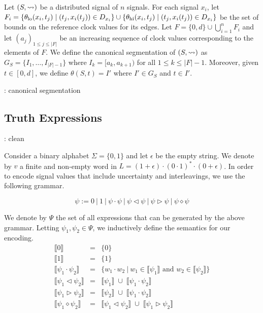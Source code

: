 Let $(S,{\rightsquigarrow})$ be a distributed signal of $n$ signals.
For each signal $x_i$, let $F_i = \{\theta_{\text{lo}}(x_i, t_j) \st (t_j, x_i(t_j)) \in D_{x_i}\} \cup \{\theta_{\text{hi}}(x_i, t_j) \st (t_j, x_i(t_j)) \in D_{x_i}\}$ be the set of bounds on the reference clock values for its edges.
Let $F = \{0, d\} \cup \bigcup_{i = 1}^{n} F_i$ and let $(a_j)_{1 \leq j \leq |F|}$ be an increasing sequence of clock values corresponding to the elements of $F$.
We define the canonical segmentation of $(S,{\rightsquigarrow})$ as $G_S = \{I_1, \ldots, I_{|F| - 1}\}$ where $I_k = [a_k, a_{k+1})$ for all $1 \leq k \leq |F| - 1$.
Moreover, given $t \in [0,d]$, we define $\theta(S,t) = I'$ where $I' \in G_S$ and $t \in I'$.

\begin{example}
	\TODO: canonical segmentation
\end{example}



\subsection{Truth Expressions}
\TODO: clean

Consider a binary alphabet $\Sigma = \{0,1\}$ and let $\epsilon$ be the empty string.
We denote by $v$ a finite and non-empty word in $L = (1 + \epsilon) \cdot (0 \cdot 1)^* \cdot (0 + \epsilon)$.
In order to encode signal values that include uncertainty and interleavings, we use the following grammar.

$$ \psi := 0 ~|~ 1 ~|~ \psi \cdot \psi ~|~ \psi \triangleleft \psi ~|~ \psi \triangleright \psi ~|~ \psi \diamond \psi $$

We denote by $\Psi$ the set of all expressions that can be generated by the above grammar.
Letting $\psi_1, \psi_2 \in \Psi$, we inductively define the semantics for our encoding.
\begin{equation}
	\begin{array}{lcl}
		\llbracket 0 \rrbracket & = & \{ 0 \} \\
		\llbracket 1 \rrbracket & = & \{ 1 \} \\
		\llbracket \psi_1 \cdot \psi_2 \rrbracket & = & \{ w_1 \cdot w_2~|~w_1 \in \llbracket \psi_1 \rrbracket \text{ and } w_2 \in \llbracket \psi_2 \rrbracket \} \\
		\llbracket \psi_1 \triangleleft \psi_2 \rrbracket & = & \llbracket \psi_1 \rrbracket \; \cup \;  \llbracket \psi_1 \cdot \psi_2 \rrbracket \\
		\llbracket \psi_1 \triangleright \psi_2 \rrbracket & = & \llbracket \psi_2 \rrbracket \; \cup \;  \llbracket \psi_1 \cdot \psi_2 \rrbracket \\
		\llbracket \psi_1 \diamond \psi_2 \rrbracket & = & \llbracket \psi_1 \triangleleft \psi_2 \rrbracket \; \cup \; \llbracket \psi_1 \triangleright \psi_2 \rrbracket\\
	\end{array}
\end{equation}

